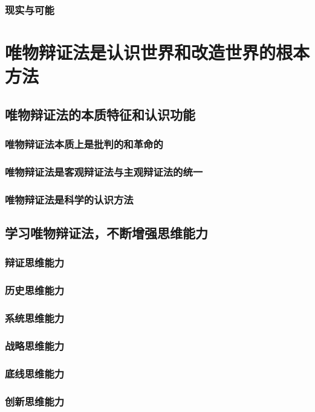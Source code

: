 \documentclass[10pt, UTF8]{book} %
\begin{document}
\subsubsection{现实与可能}

\section{唯物辩证法是认识世界和改造世界的根本方法}

\subsection{唯物辩证法的本质特征和认识功能}
\subsubsection{唯物辩证法本质上是批判的和革命的}
\subsubsection{唯物辩证法是客观辩证法与主观辩证法的统一}
\subsubsection{唯物辩证法是科学的认识方法}

\subsection{学习唯物辩证法，不断增强思维能力}
\subsubsection{辩证思维能力}
\subsubsection{历史思维能力}
\subsubsection{系统思维能力}
\subsubsection{战略思维能力}
\subsubsection{底线思维能力}
\subsubsection{创新思维能力}
\end{document}

